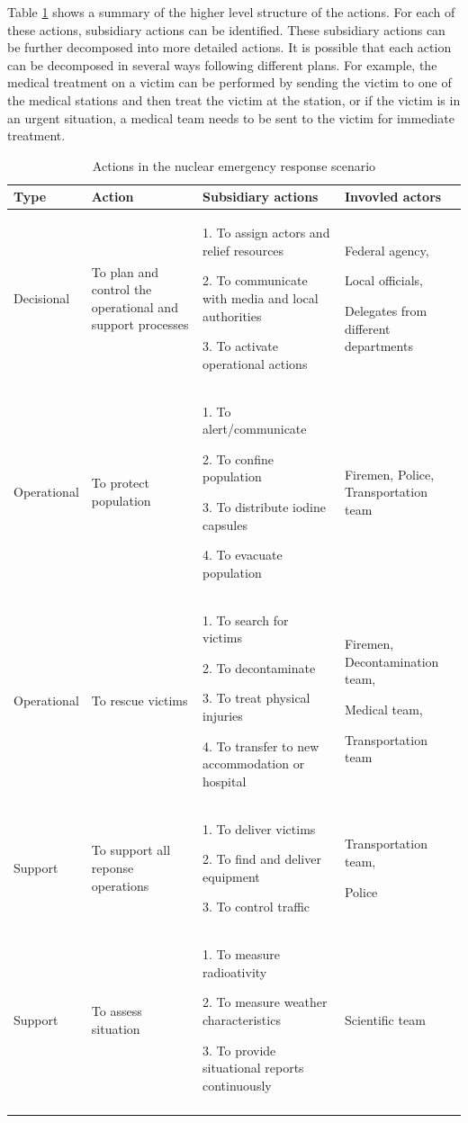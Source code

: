 Table \ref{tab:actions_in_scenario} shows a summary of the higher level structure of the actions. For each of these actions, subsidiary actions can be identified. These subsidiary actions can be further decomposed into more detailed actions. It is possible that each action can be decomposed in several ways following different plans. For example, the medical treatment on a victim can be performed by sending the victim to one of the medical stations and then treat the victim at the station, or if the victim is in an urgent situation, a medical team needs to be sent to the victim for immediate treatment.

{\footnotesize
	\begin{longtable}{>{\raggedright}p{0.8in}>{\raggedright}p{1.7in}>{\raggedright}p{2in}>{\raggedright}p{1in}}
\toprule 
\textbf{Type} & \textbf{Action} & \textbf{Subsidiary actions} & \textbf{Invovled actors}\tabularnewline
\midrule 
Decisional & To plan and control the operational and support processes & 1. To assign actors and relief resources

2. To communicate with media and local authorities 

3. To activate operational actions & Federal agency,

Local officials,

Delegates from different departments\tabularnewline
\midrule 
Operational & To protect population & 1. To alert/communicate

2. To confine population

3. To distribute iodine capsules

4. To evacuate population & Firemen, Police, Transportation team\tabularnewline
\midrule 
Operational & To rescue victims & 1. To search for victims

2. To decontaminate

3. To treat physical injuries

4. To transfer to new accommodation or hospital & Firemen, Decontamination team,

Medical team,

Transportation team\tabularnewline
\midrule 
Support & To support all reponse operations & 1. To deliver victims

2. To find and deliver equipment

3. To control traffic & Transportation team, 

Police\tabularnewline
\midrule 
Support & To assess situation & 1. To measure radioativity

2. To measure weather characteristics

3. To provide situational reports continuously & Scientific team\tabularnewline
\bottomrule
\caption{Actions in the nuclear emergency response scenario}
\label{tab:actions_in_scenario}
\end{longtable}
}

